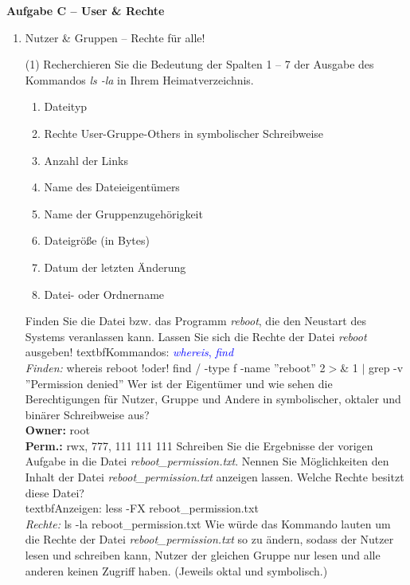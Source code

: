 \documentclass[paper=a4,fontsize=11pt]{scrartcl}%
\numberwithin{equation}{section}
\begin{document}
{\begin{center}\Large{\textbf{Aufgabe C -- User \& Rechte}}\end{center}\vskip0.25in
\begin{enumerate}

\item Nutzer \& Gruppen -- Rechte für alle!
	\begin{tasks}(1)
        \task Recherchieren Sie die Bedeutung der Spalten 1 -- 7 der Ausgabe des Kommandos \emph{ls -la} in Ihrem Heimatverzeichnis.
        \begin{enumerate}
        		\item Dateityp
        		\item Rechte User-Gruppe-Others in symbolischer Schreibweise
        		\item Anzahl der Links
        		\item Name des Dateieigentümers
        		\item Name der Gruppenzugehörigkeit
        		\item Dateigröße (in Bytes)
        		\item Datum der letzten Änderung
        		\item Datei- oder Ordnername
        \end{enumerate}
        \task Finden Sie die Datei bzw. das Programm \textit{reboot}, die den Neustart des Systems veranlassen kann. Lassen Sie sich die Rechte der Datei \textit{reboot} ausgeben!
        textbf{Kommandos:} \textcolor{blue}{\emph{whereis}, \emph{find}}\\
        \textit{Finden:} whereis reboot !oder! find / -type f -name ''reboot'' 2$>$\& 1 $|$ grep -v ''Permission denied''
        \task Wer ist der Eigentümer und wie sehen die Berechtigungen für Nutzer, Gruppe und Andere in symbolischer, oktaler und binärer Schreibweise aus?\\
        \textbf{Owner:} root\\
        \textbf{Perm.:} rwx, 777, 111 111 111
        \task Schreiben Sie die Ergebnisse der vorigen Aufgabe in die Datei \textit{reboot\-\_permission.txt}.
        \task Nennen Sie Möglichkeiten den Inhalt der Datei \textit{reboot\-\_permission.txt} anzeigen lassen. Welche Rechte besitzt diese Datei?\\
        textbf{Anzeigen:} less -FX reboot\-\_permission.txt\\
        \textit{Rechte:} ls -la reboot\-\_permission.txt
        \task Wie würde das Kommando lauten um die Rechte der Datei \textit{reboot\-\_permission.txt} so zu ändern, sodass der Nutzer lesen und schreiben kann, Nutzer der gleichen Gruppe nur lesen und alle anderen keinen Zugriff haben. (Jeweils oktal und symbolisch.) \\

\end{tasks}
\end{enumerate}}
\end{document}
